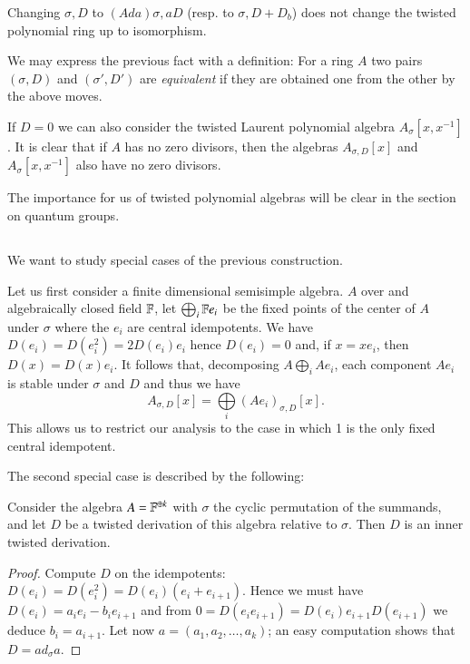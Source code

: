 \begin{prop*}
Changing $\sigma, D$ to $(Ada)\sigma, aD$ (resp. to $\sigma, D+D_{b}$) does not change the twisted polynomial ring up to isomorphism.
\end{prop*}

We may express the previous fact with a definition: For a ring $A$ two pairs $(\sigma, D)$ and $(\sigma', D')$ are \textit{equivalent} if they are obtained one from the other by the above moves.

If $D=0$ we can also consider the twisted Laurent polynomial algebra $A_{\sigma}[x, x^{-1}]$. It is clear that if $A$ has no zero divisors, then the algebras $A_{\sigma, D}[x]$ and  $A_{\sigma}[x, x^{-1}]$ also have no zero divisors.

The importance for us of twisted polynomial algebras will be clear in the section on quantum groups.

\subsection{}\label{art4-subsec-1.3}
We want to study special cases of the previous construction.

Let us first consider a finite dimensional semisimple algebra. $A$ over and algebraically closed field $\mathbb{F}$, let
$\bigoplus_{i}\mathbb{F} e_{i}$ be the fixed points of the center of $A$ under $\sigma$ where the $e_{i}$ are central idempotents. We have $D(e_{i}) =D(e_{i}^{2}) =2D(e_{i})e_{i}$ hence $D(e_{i}) = 0$ and, if $x=xe_{i}$, then $D(x)=D(x)e_{i}$. It follows that, decomposing $A \bigoplus_{i}Ae_{i}$, each component $Ae_{i}$ is stable under $\sigma$ and $D$ and thus we have
$$
A_{\sigma, D}[x]= \bigoplus\limits_{i}(Ae_{i})_{\sigma,D}[x].
$$ 
This allows us to restrict our analysis to the case in which 1 is the only fixed central idempotent.

The second special case is described by the following:

\begin{lemma*}
Consider the algebra $A=\mathbb{F}^{\oplus k}$ with $\sigma$ the cyclic permutation of the summands, and let $D$ be a twisted derivation of this algebra relative to $\sigma$. Then $D$ is an inner twisted derivation.
\end{lemma*}

\begin{proof}
Compute $D$ on the idempotents: $D(e_{i}) = D(e_{i}^{2}) =D(e_{i})(e_{i}+e_{i+1})$. Hence we must have $D(e_{i})=a_{i}e_{i}-b_{i}e_{i+1}$ and from $0=D(e_{i}e_{i+1}) = D(e_{i})e_{i+1}D(e_{i+1})$ we deduce $b_{i} =a_{i+1}$. Let now $a = (a_{1},a_{2}, \ldots, a_{k})$; an easy computation shows that $D= ad_{\sigma}a$. 
\end{proof}

